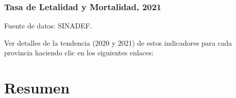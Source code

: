 \documentclass[xcolor=table]{beamer}
\begin{document}
	
	\begin{frame}[label=indicadores_provinciales]
		\frametitle{Tasa de Letalidad y Mortalidad, 2021}
		\vspace{-.5cm}
		
		\begin{table}[]
			\resizebox{\textwidth}{!}{%
				
			}
		\end{table}
		{\tiny Fuente de datos: SINADEF. \hyperlink{indice}{} \\} 
		
		Ver detalles de la tendencia (2020 y 2021) de estos indicadores para cada provincia haciendo clic en los siguientes enlaces:\\ \hyperlink{Acomayo}{} \hyperlink{Anta}{} \hyperlink{Calca}{} \hyperlink{Canas}{} \hyperlink{Chumbivilcas}{}
		\hyperlink{Canchis}{} \hyperlink{Cusco}{}
		\hyperlink{Espinar}{}
		\hyperlink{laconvencion}{}
		\hyperlink{Paruro}{} \hyperlink{Paucartambo}{}
		\hyperlink{Quispicanchi}{}
		\hyperlink{Urubamba}{}
	\end{frame}

\section{Resumen }
\end{document}
